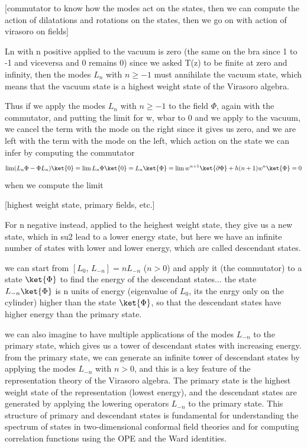     [commutator to know how the modes act on the states, then we can compute the action of dilatations and rotations on the states, then we go on with action of virasoro on fields]

Ln with n positive applied to the vacuum is zero (the same on the bra since 1 to -1 and viceversa and 0 remains 0)
since we asked T(z) to be finite at zero and infinity, then the modes \(L_n\) with \(n \geq -1\) must annihilate the vacuum state, which means that the vacuum state is a highest weight state of the Virasoro algebra.

Thus if we apply the modes \(L_n\) with \(n \geq -1\) to the field \(\Phi\), again with the commutator, and putting the limit for w, wbar to 0 and we apply to the vacuum, we cancel the term with the mode on the right since it gives us zero, and we are left with the term with the mode on the left, which action on the state we can infer by computing the commutator
\[
    \lim (L_n \Phi - \Phi L_n) \ket{0} = \lim L_n \Phi \ket{0} = L_n \ket{\Phi} = \lim w^{n+1} \ket{\partial \Phi} + h (n+1) w^n \ket{\Phi} = 0
\]
when we compute the limit

    [highest weight state, primary fields, etc.]

For n negative instead, applied to the heighest weight state, they give us a new state, which in su2 lead to a lower energy state, but here we have an infinite number of states with lower and lower energy, which are called descendant states.

we can start from \([L_0,\,L_{-n}] = nL_{-n}\) (\(n>0\)) and apply it (the commutator) to a state \(\ket{\Phi}\) to find the energy of the descendant states...
the state \(L_{-n}\ket{\Phi}\) is n units of energy (eigenvalue of \(L_0\), its the enrgy only on the cylinder) higher than the state \(\ket{\Phi}\), so that the descendant states have higher energy than the primary state.

we can also imagine to have multiple applications of the modes \(L_{-n}\) to the primary state, which gives us a tower of descendant states with increasing energy. from the primary state, we can generate an infinite tower of descendant states by applying the modes \(L_{-n}\) with \(n>0\), and this is a key feature of the representation theory of the Virasoro algebra. The primary state is the highest weight state of the representation (lowest energy), and the descendant states are generated by applying the lowering operators \(L_{-n}\) to the primary state. This structure of primary and descendant states is fundamental for understanding the spectrum of states in two-dimensional conformal field theories and for computing correlation functions using the OPE and the Ward identities.

